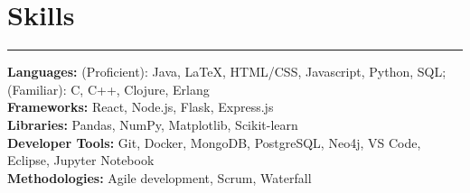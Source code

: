 \documentclass[10pt]{article}
\begin{document}
\section*{Skills}
\vspace{-2mm}
\hrule
\vspace{0mm}
\textbf{Languages:} (Proficient): Java, LaTeX, HTML/CSS, Javascript, Python, SQL; (Familiar): C, C++, Clojure, Erlang \\
\textbf{Frameworks:} React, Node.js, Flask, Express.js  \\
\textbf{Libraries:} Pandas, NumPy, Matplotlib, Scikit-learn \\
\textbf{Developer Tools:} Git, Docker, MongoDB, PostgreSQL, Neo4j, VS Code, Eclipse, Jupyter Notebook \\
\textbf{Methodologies:} Agile development, Scrum, Waterfall
\end{document}
